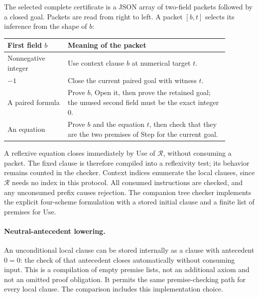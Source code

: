\documentclass[11pt]{article}
\theoremstyle{definition}
\newcommand{\RR}{\mathcal R}
\begin{document}
The selected complete certificate is a JSON array of two-field packets
followed by a closed goal. Packets are read from right to left. A packet
$[b,t]$ selects its inference from the shape of $b$:
\begin{center}
\begin{tabular}{@{}p{0.24\linewidth}p{0.64\linewidth}@{}}
\toprule
First field $b$ & Meaning of the packet\\
\midrule
Nonnegative integer & Use context clause $b$ at numerical target $t$.\\
$-1$ & Close the current paired goal with witness $t$.\\
A paired formula & Prove $b$, Open it, then prove the retained goal;
the unused second field must be the exact integer $0$.\\
An equation & Prove $b$ and the equation $t$, then check that they are
the two premises of Step for the current goal.\\
\bottomrule
\end{tabular}
\end{center}

A reflexive equation closes immediately by Use of $\RR$, without consuming
a packet. The fixed clause is therefore compiled into a reflexivity test;
its behavior remains counted in the checker. Context indices enumerate
the local clauses, since $\RR$ needs no index in this protocol. All consumed
instructions are checked, and any unconsumed prefix causes rejection.
The companion tree checker implements the explicit four-scheme formulation
with a stored initial clause and a finite list of premises for Use.

\paragraph{Neutral-antecedent lowering.}
An unconditional local clause can be stored internally as a clause with
antecedent $0=0$: the check of that antecedent closes automatically without
consuming input. This is a compilation of empty premise lists, not an
additional axiom and not an omitted proof obligation. It permits the same
premise-checking path for every local clause. The comparison includes this
implementation choice.
\end{document}
